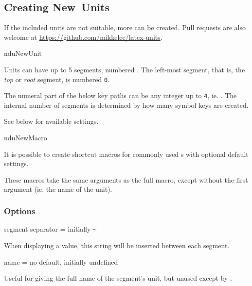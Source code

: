 \documentclass{article}
\begin{document}
\subsection{Creating New Units} %

\label{units:new}
If the included units are not suitable, more can be created. Pull requests are also welcome at \url{https://github.com/mikkelee/latex-units}.

\begin{docCommand}
	{nduNewUnit}
	{}
	
Units can have up to 5 segments, numbered . The left-most segment, that is, the \emph{top} or \emph{root} segment, is numbered \texttt{0}.

The numeral part of the below key paths  can be any integer up to \texttt{4}, ie. . The internal number of segments is determined by how many symbol keys are created.

See below for available settings.

\end{docCommand}

\begin{docCommand}
	{nduNewMacro}
	{}

	It is possible to create shortcut macros for commonly used s with optional default settings.

	These macros take the same arguments as the full  macro, except without the first argument (ie. the name of the unit).

\end{docCommand}

\clearpage
\subsubsection{Options}

\begin{docKey}
	{segment separator}
	{=}
	{initially \texttt{\~{}}}
	
	When displaying a value, this string will be inserted between each segment.
\end{docKey}

\begin{docKey}
	[segment 0]{name}
	{=}
	{no default, initially undefined}

	Useful for giving the full name of the segment's unit, but unused except by .
\end{docKey}
\end{document}
